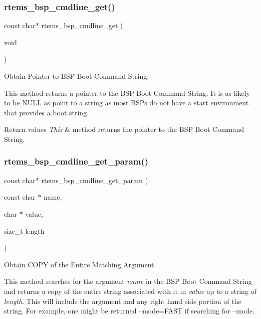 \subsubsection{\texorpdfstring{rtems\_bsp\_cmdline\_get()}{rtems\_bsp\_cmdline\_get()}}
{\footnotesize\ttfamily const char$\ast$ rtems\+\_\+bsp\+\_\+cmdline\+\_\+get (\begin{DoxyParamCaption}\item[{void}]{ }\end{DoxyParamCaption})}



Obtain Pointer to B\+SP Boot Command String. 

This method returns a pointer to the B\+SP Boot Command String. It is as likely to be N\+U\+LL as point to a string as most B\+S\+Ps do not have a start environment that provides a boot string.


\begin{DoxyRetVals}{Return values}
{\em This} & method returns the pointer to the B\+SP Boot Command String. \\
\hline
\end{DoxyRetVals}
\mbox{\label{group__BSPCommandLine_gad7c20e3e7204c22bbbf8fed563f70d44}} 
\subsubsection{\texorpdfstring{rtems\_bsp\_cmdline\_get\_param()}{rtems\_bsp\_cmdline\_get\_param()}}
{\footnotesize\ttfamily const char$\ast$ rtems\+\_\+bsp\+\_\+cmdline\+\_\+get\+\_\+param (\begin{DoxyParamCaption}\item[{const char $\ast$}]{name,  }\item[{char $\ast$}]{value,  }\item[{size\+\_\+t}]{length }\end{DoxyParamCaption})}



Obtain C\+O\+PY of the Entire Matching Argument. 

This method searches for the argument {\itshape name} in the B\+SP Boot Command String and returns a copy of the entire string associated with it in {\itshape value} up to a string of {\itshape length}. This will include the argument and any right hand side portion of the string. For example, one might be returned --mode=F\+A\+ST if searching for --mode.


